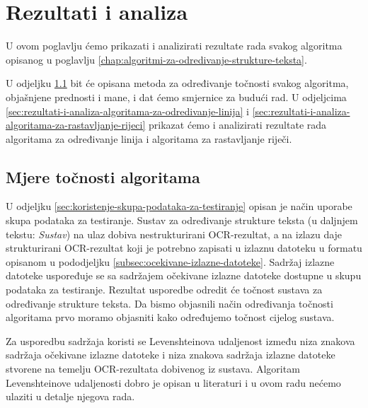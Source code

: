 \documentclass[times, utf8, zavrsni]{fer}
\begin{document}
\chapter{Rezultati i analiza}
U ovom poglavlju ćemo prikazati i analizirati rezultate rada svakog algoritma
opisanog u poglavlju \ref{chap:algoritmi-za-odredivanje-strukture-teksta}.

U odjeljku \ref{sec:mjera-tocnosti-algoritama} bit će opisana metoda
za određivanje točnosti svakog algoritma, objašnjene prednosti i mane, i
dat ćemo smjernice za budući rad. U odjeljcima
\ref{sec:rezultati-i-analiza-algoritama-za-odredivanje-linija} i
\ref{sec:rezultati-i-analiza-algoritama-za-rastavljanje-rijeci} prikazat ćemo
i analizirati rezultate rada algoritama za određivanje linija i algoritama za
rastavljanje riječi.








\section{Mjere točnosti algoritama}
\label{sec:mjera-tocnosti-algoritama}
U odjeljku \ref{sec:koristenje-skupa-podataka-za-testiranje} opisan je način
uporabe skupa podataka za testiranje. Sustav za određivanje strukture teksta
(u daljnjem tekstu: \emph{Sustav}) na ulaz dobiva nestrukturirani OCR-rezultat,
a na izlazu daje strukturirani OCR-rezultat koji je potrebno zapisati u izlaznu datoteku u formatu opisanom u pododjeljku
\ref{subsec:ocekivane-izlazne-datoteke}. Sadržaj izlazne datoteke uspoređuje se sa sadržajem očekivane
izlazne datoteke dostupne u skupu podataka za testiranje. Rezultat usporedbe
odredit će točnost sustava za određivanje strukture teksta. Da bismo objasnili
način određivanja točnosti algoritama prvo moramo objasniti kako određujemo
točnost cijelog sustava.

Za usporedbu sadržaja koristi se Levenshteinova udaljenost između niza znakova
sadržaja očekivane izlazne datoteke i niza znakova sadržaja izlazne datoteke
stvorene na temelju OCR-rezultata dobivenog iz sustava.
Algoritam Levenshteinove udaljenosti dobro je opisan u literaturi i u ovom radu
nećemo ulaziti u detalje njegova rada.
\end{document}
